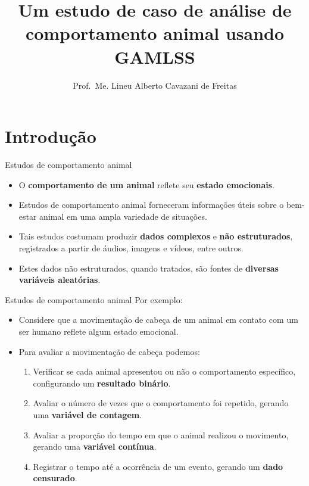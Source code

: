 \documentclass[
  ignorenonframetext,
  serif,
  professionalfont,
  usenames,
  dvipsnames,
  aspectratio = 169]{beamer}
\title{\textbf{Um estudo de caso de análise de comportamento animal usando GAMLSS}}
\author{Prof.~Me. Lineu Alberto Cavazani de Freitas}
\date{}
\institute{Departamento de Estatística\\
Laboratório de Estatística e Geoinformação}
\begin{document}
\frame{\titlepage}

\hypertarget{introduuxe7uxe3o}{%
\section{Introdução}\label{introduuxe7uxe3o}}

\begin{frame}{Estudos de comportamento animal}
\protect\hypertarget{estudos-de-comportamento-animal}{}
\begin{itemize}
\item
  O \textbf{comportamento de um animal} reflete seu
  \textbf{estado emocionais}.
\item
  Estudos de comportamento animal forneceram informações úteis sobre o
  bem-estar animal em uma ampla variedade de situações.
\item
  Tais estudos costumam produzir \textbf{dados complexos} e
  \textbf{não estruturados}, registrados a partir de áudios, imagens e
  vídeos, entre outros.
\item
  Estes dados não estruturados, quando tratados, são fontes de
  \textbf{diversas variáveis aleatórias}.
\end{itemize}
\end{frame}

\begin{frame}{Estudos de comportamento animal}
\protect\hypertarget{estudos-de-comportamento-animal-1}{}
Por exemplo:

\begin{itemize}
\item
  Considere que a movimentação de cabeça de um animal em contato com um
  ser humano reflete algum estado emocional.
\item
  Para avaliar a movimentação de cabeça podemos:

  \begin{enumerate}
  \item
    Verificar se cada animal apresentou ou não o comportamento
    específico, configurando um \textbf{resultado binário}.
  \item
    Avaliar o número de vezes que o comportamento foi repetido, gerando
    uma \textbf{variável de contagem}.
  \item
    Avaliar a proporção do tempo em que o animal realizou o movimento,
    gerando uma \textbf{variável contínua}.
  \item
    Registrar o tempo até a ocorrência de um evento, gerando um
    \textbf{dado censurado}.
  \end{enumerate}
\end{itemize}
\end{frame}
\end{document}
